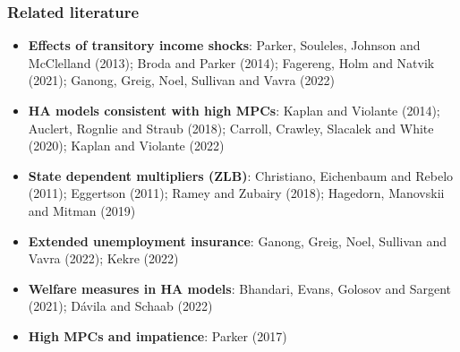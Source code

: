 \documentclass[pdflatex,aspectratio=169]{beamer}
\begin{document}
\begin{frame}
  \frametitle{Related literature}
  \small
  \begin{itemize}[<+->]
    \item
          \textbf{Effects of transitory income shocks}:
          Parker, Souleles, Johnson and McClelland (2013); Broda and Parker (2014); Fagereng, Holm and Natvik (2021); Ganong, Greig, Noel, Sullivan and Vavra (2022)
    \item
          \textbf{HA models consistent with high MPCs}:
          Kaplan and Violante (2014); Auclert, Rognlie and Straub (2018); Carroll, Crawley, Slacalek and White (2020); Kaplan and Violante (2022)
    \item
          \textbf{State dependent multipliers (ZLB)}:
          Christiano, Eichenbaum and Rebelo (2011); Eggertson (2011); Ramey and Zubairy (2018); Hagedorn, Manovskii and Mitman (2019)
    \item
          \textbf{Extended unemployment insurance}:
          Ganong, Greig, Noel, Sullivan and Vavra (2022); Kekre (2022)
    \item
          \textbf{Welfare measures in HA models}:
          Bhandari, Evans, Golosov and Sargent (2021); D{\'a}vila and Schaab (2022)
    \item
          \textbf{High MPCs and impatience}: Parker (2017)
  \end{itemize}
  \normalsize
\end{frame}
\end{document}
